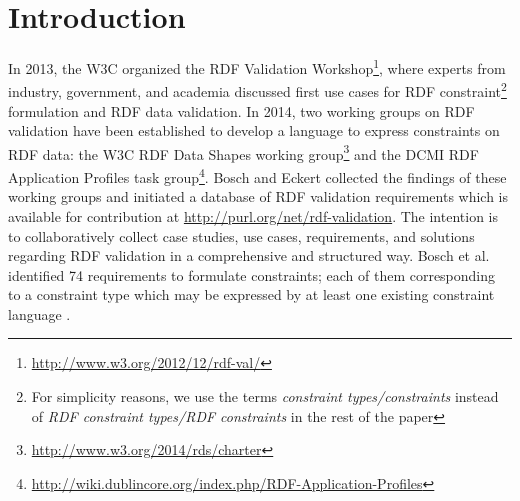 \documentclass{llncs}
\begin{document}
\section{Introduction}

In 2013, the W3C organized the RDF Validation Workshop\footnote{\url{http://www.w3.org/2012/12/rdf-val/}}, 
where experts from industry, government, and academia discussed first use cases for RDF constraint\footnote{For simplicity reasons, we use the terms \emph{constraint types/constraints} instead of \emph{RDF constraint types/RDF constraints} in the rest of the paper} formulation and RDF data validation.
In 2014, two working groups on RDF validation have been established to develop a language to express constraints on RDF data: 
the W3C RDF Data Shapes working group\footnote{\url{http://www.w3.org/2014/rds/charter}} and the DCMI RDF Application Profiles task group\footnote{\url{http://wiki.dublincore.org/index.php/RDF-Application-Profiles}}. 
Bosch and Eckert \cite{BoschEckert2014} collected the findings of these working groups and initiated a database of RDF validation requirements
which is available for contribution at \url{http://purl.org/net/rdf-validation}.
The intention is to collaboratively collect case studies, use cases, requirements, and solutions regarding RDF validation in a comprehensive and structured way. 
Bosch et al. identified 74 requirements to formulate constraints; each of them corresponding to a constraint type which may be expressed by at least one existing constraint language \cite{BoschNolleAcarEckert2015}. 
\end{document}
